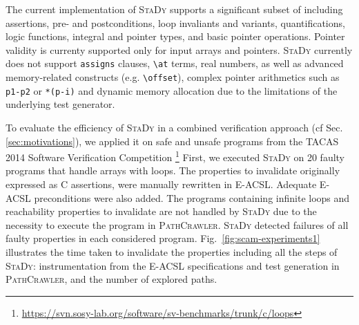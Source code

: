 The current implementation of  
\textsc{StaDy} supports a significant subset of \eacsl including
assertions, pre- and postconditions, loop invaliants and variants,
quantifications, logic functions, integral and pointer types, and
basic pointer operations. Pointer validity is currenty supported
only for input arrays and pointers.
\textsc{StaDy} currently  does not support 
\lstinline{assigns} clauses, \lstinline{\at} terms, 
real numbers, as well as advanced memory-related constructs
(e.g. \lstinline{\offset}), complex pointer
arithmetics such as \lstinline'p1-p2' or \lstinline'*(p-i)' and dynamic memory allocation  
due to the limitations of the underlying test generator. 

To evaluate the efficiency of \textsc{StaDy} 
in a combined verification approach
(cf Sec. \ref{sec:motivations}),
we applied it on safe and unsafe programs from the TACAS 2014
Software Verification Competition%
\footnote{\url{https://svn.sosy-lab.org/software/sv-benchmarks/trunk/c/loops}}
First, we 
executed \textsc{StaDy} on 20 faulty programs that  handle arrays
with loops. The properties to invalidate originally 
expressed as C assertions, were manually rewritten in \textsc{E-ACSL}.
Adequate \textsc{E-ACSL} preconditions were also added. The programs
containing infinite loops and reachability properties to invalidate are not
handled by  \textsc{StaDy} due to the necessity to execute the program in
\textsc{Path\-Crawler}.
\textsc{Sta\-Dy}
 detected failures of all faulty properties in each considered program. 
Fig.~\ref{fig:scam-experiments1} illustrates the time taken to
invalidate the properties including all the steps of \textsc{Sta\-Dy}:
instrumentation from the \textsc{E-ACSL} specifications and test generation in
\textsc{PathCrawler}, and the number of explored paths.

